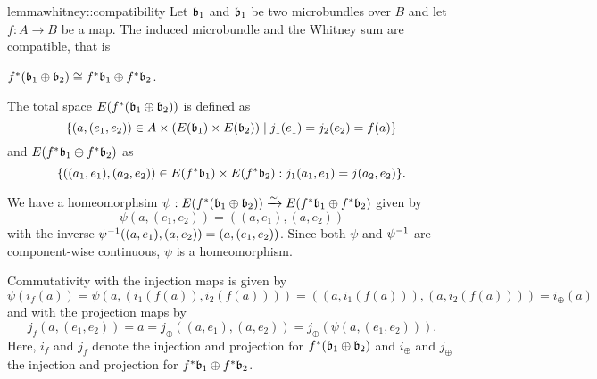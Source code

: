 \begin{scope}
    \newcommand{\wleft} {%
        \ind{f} (\whitney{\bb_1}{\bb_2})%
    }
    \newcommand{\wright} {%
        \whitney{\ind{f}\bb_1}{\ind{f}\bb_2}%
    }

    \begin{mystatement}{lemma}{whitney::compatibility}
        Let $\bb_1$ and $\bb_1$ be two microbundles over $B$ and let $f: A \to B$ be a map.
        The induced microbundle and the Whitney sum are compatible, that is
        \begin{center}
            $\wleft \cong \wright$.
        \end{center}
    \end{mystatement}

    \begin{myproof}
        The total space $E(\wleft)$ is defined as
        \[ \{(a, (e_1, e_2)) \in A \cross (E(\bb_1) \cross E(\bb_2)) \mid j_1(e_1) = j_2(e_2) = f(a) \} \]
        and $E(\wright)$ as
        \[ \set{((a_1, e_1), (a_2, e_2)) \in E(\ind{f}\bb_1) \cross E(\ind{f}\bb_2)}{j_1(a_1, e_1) = j(a_2, e_2)}. \]

        We have a homeomorphsim $\psi: E(\wleft) \isomto E(\wright)$ given by
        \[ \psi(a, (e_1, e_2)) = ((a, e_1), (a, e_2)) \]
        with the inverse $\psi^{-1}((a, e_1), (a, e_2)) = (a, (e_1, e_2))$.
        Since both $\psi$ and $\psi^{-1}$ are component-wise continuous,
        $\psi$ is a homeomorphism.
        
        Commutativity with the injection maps is given by
        \[ \psi(i_f(a)) = \psi(a, (i_1(f(a)), i_2(f(a)))) = ((a, i_1(f(a))), (a, i_2(f(a)))) = i_\oplus(a) \]
        and with the projection maps by
        \[ j_f(a, (e_1, e_2)) = a = j_\oplus((a, e_1), (a, e_2)) = j_\oplus(\psi(a, (e_1, e_2))). \]
        Here, $i_f$ and $j_f$ denote the injection and projection for $\wleft$
        and $i_\oplus$ and $j_\oplus$ the injection and projection for $\wright$.
    \end{myproof}
\end{scope}